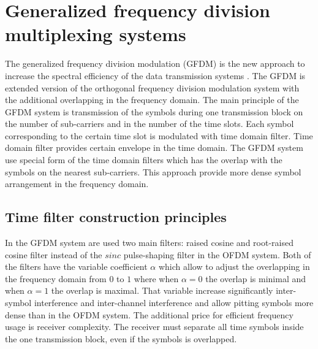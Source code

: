 \section{Generalized frequency division multiplexing systems}\label{sec:GFDM}
The generalized frequency division modulation (GFDM) is the new approach to increase the spectral efficiency of the data transmission systems\cite{Book25} \cite{Book22}. The GFDM is extended version of the orthogonal frequency division modulation system with the additional overlapping in the frequency domain. The main principle of the GFDM system is transmission of the symbols during one transmission block on the number of sub-carriers and in the number of the time slots. Each symbol corresponding to the certain time slot is modulated with time domain filter. Time domain filter provides certain envelope in the time domain. The GFDM system use special form of the time domain filters which has the overlap with the symbols on the nearest sub-carriers. This approach provide more dense symbol arrangement in the frequency domain\cite{Book24}.
\subsection{Time filter construction principles}\label{part:TFCP}
 In the GFDM system are used two main filters: raised cosine and root-raised cosine filter instead of the $sinc$ pulse-shaping filter in the OFDM system.  Both of the filters have the variable coefficient $\alpha$ which allow to adjust the overlapping in the frequency domain from $0$ to $1$ where when $\alpha=0$ the overlap is minimal and  when $\alpha=1$ the overlap is maximal\cite{Book30}\cite{Book21}. That variable increase significantly inter-symbol interference and inter-channel interference and allow pitting symbols more dense than in the OFDM system. The additional price for efficient frequency usage is receiver complexity. The receiver must separate all time symbols inside the one transmission block, even if the symbols is overlapped. 
 
